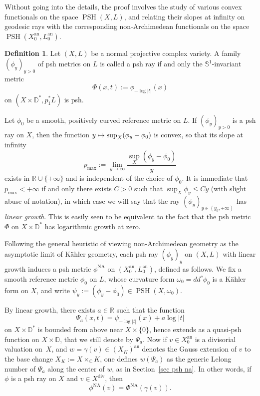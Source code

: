 \documentclass[JEP,XML,SOM,Unicode,published]{cedram}
\newcommand\mto{\mathchoice{\longmapsto}{\mapsto}{\mapsto}{\mapsto}}
\theoremstyle{definition}
\newtheorem{defn}[equation]{Definition}
\newcommand \C{\mathbb C}
\newcommand \D {\mathbb{D}}
\newcommand \R{\mathbb R}
\newcommand \bS {\mathbb S}
\newcommand{\an}{\mathrm{an}}
\DeclareMathOperator{\NA}{NA}
\DeclareMathOperator{\PSH}{PSH}
\DeclareMathOperator{\xdiv}{div}
\begin{document}
Without going into the details, the proof involves the study of various convex functionals on the space $\PSH(X, L)$, and relating their slopes at infinity on geodesic rays with the corresponding non-Archimedean functionals on the space $\PSH(X^{\an}_0, L^{\an}_0)$.
\begin{defn} Let $(X, L)$ be a normal projective complex variety. A family $(\phi_y)_{y >0}$ of psh metrics on $L$ is called a psh ray if and only the $\bS^1$-invariant metric\vspace*{-3pt}
\[
\Phi(x, t):= \phi_{- \log \lvert t \rvert} (x)
\]
on $(X \times \D^*, p_1^*L)$ is psh.
\end{defn}
Let $\phi_0$ be a smooth, positively curved reference metric on $L$. If $(\phi_y)_{y >0}$ is a psh ray on $X$, then the function $y \mto \sup_{X} (\phi_y-\phi_0)$ is convex, so that its slope at infinity\vspace*{-3pt}
\[
p_{\max}:= \lim_{y \to \infty} \frac{ \sup_X (\phi_y - \phi_0)}{y}
\]
exists in $\R \cup \{ +\infty \}$ and is independent of the choice of $\phi_0$. It is immediate that $p_{\max} < + \infty$ if and only there exists $C>0$ such that $\sup_X \phi_y \le C y$ (with slight abuse of notation), in which case we will say that the ray $(\phi_y)_{y \in (y_0, + \infty)}$ has \emph{linear growth}. This is easily seen to be equivalent to the fact that the psh metric $\Phi$ on $X \times \D^*$ has logarithmic growth at zero.

Following the general heuristic of viewing non-Archimedean geometry as the asymp\-totic limit of Kähler geometry, each psh ray $(\phi_y)_y$ on $(X, L)$ with linear growth induces a psh metric $\phi^{\NA}$ on $(X_0^{\an}, L_0^{\an})$, defined as follows. We fix a smooth reference metric $\phi_0$ on $L$, whose curvature form $\omega_0 = dd^c \phi_0$ is a Kähler form on $X$, and write $\psi_y:= (\phi_y - \phi_0) \in \PSH(X, \omega_0)$.

By linear growth, there exists $a \in \R$ such that the function\vspace*{-3pt}
\[
\Psi_a(x, t) = \psi_{- \log \lvert t \rvert} (x) + a \log \lvert t \rvert
\]
on $X \times \D^*$ is bounded from above near $X \times \{0 \}$, hence extends as a quasi-psh function on $X \times \D$, that we still denote by $\Psi_a$. Now if $v \in X_0^{\an}$ is a divisorial valuation on~$X$, and $w= \gamma(v) \in (X_K)^{\an}$ denotes the Gauss extension of $v$ to the base change $X_K:=X \times_{\C} K$, one defines $w(\Psi_a)$ as the generic Lelong number of $\Psi_a$ along the center of $w$, as in Section~\ref{sec psh na}. In other words, if $\phi$ is a psh ray on $X$ and $v \in X^{\xdiv}$, then\vspace*{-3pt}
\[
\phi^{\NA}(v) = \Phi^{\NA}(\gamma(v)).
\]
\end{document}
